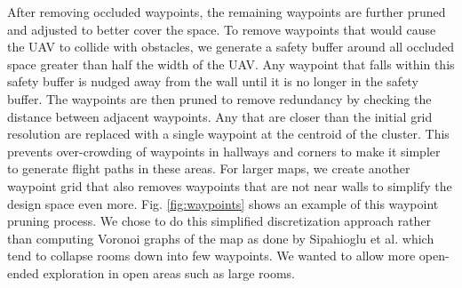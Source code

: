 \documentclass[letterpaper, 10 pt, conference]{ieeeconf}  %
\begin{document}
After removing occluded waypoints, the remaining waypoints are further pruned and adjusted to better cover the space. To remove waypoints that would cause the UAV to collide with obstacles, we generate a safety buffer around all occluded space greater than half the width of the UAV. Any waypoint that falls within this safety buffer is nudged away from the wall until it is no longer in the safety buffer. The waypoints are then pruned to remove redundancy by checking the distance between adjacent waypoints. Any that are closer than the initial grid resolution are replaced with a single waypoint at the centroid of the cluster. This prevents over-crowding of waypoints in hallways and corners to make it simpler to generate flight paths in these areas. For larger maps, we create another waypoint grid that also removes waypoints that are not near walls to simplify the design space even more. Fig. \ref{fig:waypoints} shows an example of this waypoint pruning process. We chose to do this simplified discretization approach rather than computing Voronoi graphs of the map as done by Sipahioglu et al. \cite{Sipahioglu2010} which tend to collapse rooms down into few waypoints. We wanted to allow more open-ended exploration in open areas such as large rooms.
\end{document}
